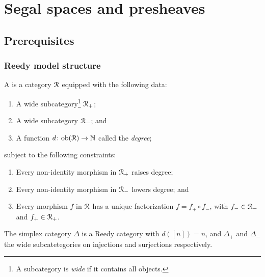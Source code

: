 \documentclass[main.tex]{subfiles}
\begin{document}
\chapter{Segal spaces and presheaves}
\label{ch:segal_spaces_and_presheaves}

\section{Prerequisites}
\label{sec:prerequisites}

\subsection{Reedy model structure}
\label{ssc:reedy_model_structure}

\begin{definition}
  A  is a category $\mathcal{R}$ equipped with the following data:
  \begin{enumerate}
    \item A wide subcategory\footnote{A subcategory is \emph{wide} if it contains all objects.} $\mathcal{R}_{+}$;

    \item A wide subcategory $\mathcal{R}_{-}$; and

    \item A function $d\colon \mathrm{ob}(\mathcal{R}) \to \mathbb{N}$ called the \emph{degree};
  \end{enumerate}
  subject to the following constraints:
  \begin{enumerate}
    \item Every non-identity morphism in $\mathcal{R}_{+}$ raises degree;

    \item Every non-identity morphism in $\mathcal{R}_{-}$ lowers degree; and

    \item Every morphism $f$ in $\mathcal{R}$ has a unique factorization $f = f_{+} \circ f_{-}$, with $f_{-} \in \mathcal{R}_{-}$ and $f_{+} \in \mathcal{R}_{+}$.
  \end{enumerate}
\end{definition}

\begin{example}
  The simplex category $\Delta$ is a Reedy category with $d([n]) = n$, and $\Delta_{+}$ and $\Delta_{-}$ the wide subcatetegories on injections and surjections respectively.
\end{example}
\end{document}

